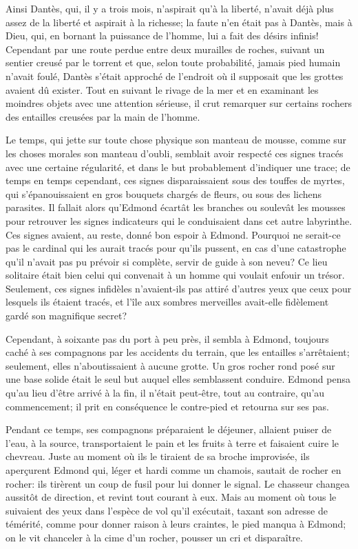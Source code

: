 Ainsi Dantès, qui, il y a trois mois, n'aspirait qu'à la liberté, n'avait déjà plus assez de la liberté et aspirait à la richesse; la faute n'en était pas à Dantès, mais à Dieu, qui, en bornant la puissance de l'homme, lui a fait des désirs infinis! Cependant par une route perdue entre deux murailles de roches, suivant un sentier creusé par le torrent et que, selon toute probabilité, jamais pied humain n'avait foulé, Dantès s'était approché de l'endroit où il supposait que les grottes avaient dû exister. Tout en suivant le rivage de la mer et en examinant les moindres objets avec une attention sérieuse, il crut remarquer sur certains rochers des entailles creusées par la main de l'homme.

Le temps, qui jette sur toute chose physique son manteau de mousse, comme sur les choses morales son manteau d'oubli, semblait avoir respecté ces signes tracés avec une certaine régularité, et dans le but probablement d'indiquer une trace; de temps en temps cependant, ces signes disparaissaient sous des touffes de myrtes, qui s'épanouissaient en gros bouquets chargés de fleurs, ou sous des lichens parasites. Il fallait alors qu'Edmond écartât les branches ou soulevât les mousses pour retrouver les signes indicateurs qui le conduisaient dans cet autre labyrinthe. Ces signes avaient, au reste, donné bon espoir à Edmond. Pourquoi ne serait-ce pas le cardinal qui les aurait tracés pour qu'ils pussent, en cas d'une catastrophe qu'il n'avait pas pu prévoir si complète, servir de guide à son neveu? Ce lieu solitaire était bien celui qui convenait à un homme qui voulait enfouir un trésor. Seulement, ces signes infidèles n'avaient-ils pas attiré d'autres yeux que ceux pour lesquels ils étaient tracés, et l'île aux sombres merveilles avait-elle fidèlement gardé son magnifique secret?

Cependant, à soixante pas du port à peu près, il sembla à Edmond, toujours caché à ses compagnons par les accidents du terrain, que les entailles s'arrêtaient; seulement, elles n'aboutissaient à aucune grotte. Un gros rocher rond posé sur une base solide était le seul but auquel elles semblassent conduire. Edmond pensa qu'au lieu d'être arrivé à la fin, il n'était peut-être, tout au contraire, qu'au commencement; il prit en conséquence le contre-pied et retourna sur ses pas.

Pendant ce temps, ses compagnons préparaient le déjeuner, allaient puiser de l'eau, à la source, transportaient le pain et les fruits à terre et faisaient cuire le chevreau. Juste au moment où ils le tiraient de sa broche improvisée, ils aperçurent Edmond qui, léger et hardi comme un chamois, sautait de rocher en rocher: ils tirèrent un coup de fusil pour lui donner le signal. Le chasseur changea aussitôt de direction, et revint tout courant à eux. Mais au moment où tous le suivaient des yeux dans l'espèce de vol qu'il exécutait, taxant son adresse de témérité, comme pour donner raison à leurs craintes, le pied manqua à Edmond; on le vit chanceler à la cime d'un rocher, pousser un cri et disparaître.

